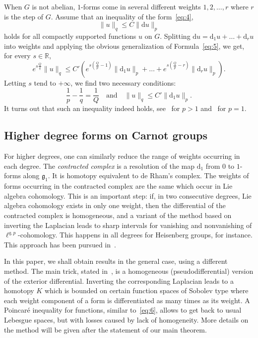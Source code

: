 \documentclass[11pt]{article}
\theoremstyle{definition}
\numberwithin{equation}{section}
\numberwithin{figure}{section}
\numberwithin{table}{section}
\newcommand{\R}{\mathbb{R}}
\newcommand{\dd}{\mathrm{d}}
\newcommand{\du}{\dd u}
\begin{document}
When $G$ is not abelian, $1$-forms come in several different weights $1,2,\dots,r$ where $r$ is the step of $G$. Assume that an inequality of the form~\eqref{eq:4},
\begin{equation*}
\|u\|_q \leq C \|\du\|_p
\end{equation*}
holds for all compactly supported functions $u$ on $G$. Splitting $\du=\dd_1 u+\dots +\dd_r u$ into weights and applying the obvious generalization of Formula~\eqref{eq:5}, we get, for every $s\in\R$,
\begin{equation*}
e^{s\frac{Q}{q}} \|u\|_q \leq C' \left(e^{s(\frac{Q}{p}-1)}\|\dd_1 u\|_p+\dots +e^{s(\frac{Q}{p}-r)}\|\dd_r u\|_p\right).
\end{equation*}
Letting $s$ tend to $+\infty$, we find two necessary conditions:
\begin{equation}\label{eq:6}
\frac{1}{p}-\frac{1}{q}=\frac{1}{Q} \quad \text{and}\quad \|u\|_q \leq C' \|\dd_1 u\|_p.
\end{equation}
It turns out that such an inequality indeed holds, see~\cite{FollandStein} for $p>1$ and~\cite{VCSC} for $p=1$.

\subsection{Higher degree forms on Carnot groups}

For higher degrees, one can similarly reduce the range of weights occurring in each degree. The \emph{contracted complex} is a resolution of the map $\dd_1$ from $0$ to $1$-forms along $\mathfrak{g}_1$. It is homotopy equivalent to de Rham's complex. The weights of forms occurring in the contracted complex are the same which occur in Lie algebra cohomology. This is an important step: if, in two consecutive degrees, Lie algebra cohomology exists in only one weight, then the differential of the contracted complex is homogeneous, and a variant of the method based on inverting the Laplacian leads to sharp intervals for vanishing and nonvanishing of $\ell^{q,p}$-cohomology. This happens in all degrees for Heisenberg groups, for instance. This approach has been pursued in~\cite{BFP}.

In this paper, we shall obtain results in the general case, using a different method. The main trick, stated in~\cite{Rumin_CRAS_1999}, is a homogeneous (pseudodifferential) version of the exterior differential. Inverting the corresponding Laplacian leads to a homotopy $K$ which is bounded on certain function spaces of Sobolev type where each weight component of a form is differentiated as many times as its weight. A Poincar\'e inequality for functions, similar to~\eqref{eq:6}, allows to get back to usual Lebesgue spaces, but with losses caused by lack of homogeneity. More details on the method will be given after the statement of our main theorem.
\end{document}
